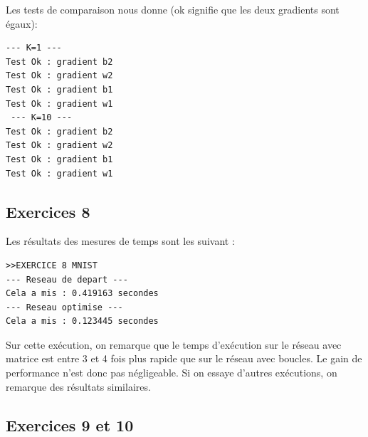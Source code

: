 \documentclass[a4paper,11pt]{article}
\begin{document}
Les tests de comparaison nous donne (ok signifie que les deux gradients sont égaux):

\begin{verbatim}
--- K=1 ---
Test Ok : gradient b2
Test Ok : gradient w2
Test Ok : gradient b1
Test Ok : gradient w1
 --- K=10 ---
Test Ok : gradient b2
Test Ok : gradient w2
Test Ok : gradient b1
Test Ok : gradient w1
\end{verbatim}


\subsection{Exercices 8}

Les résultats des mesures de temps sont les suivant : 

\begin{verbatim}
>>EXERCICE 8 MNIST
--- Reseau de depart ---
Cela a mis : 0.419163 secondes
--- Reseau optimise ---
Cela a mis : 0.123445 secondes
\end{verbatim}

Sur cette exécution, on remarque que le temps d'exécution sur le réseau avec matrice est entre 3 et 4 fois plus rapide que sur le réseau avec boucles. Le gain de performance n'est donc pas négligeable.
Si on essaye d'autres exécutions, on remarque des résultats similaires.

\subsection{Exercices 9 et 10}
\end{document}
